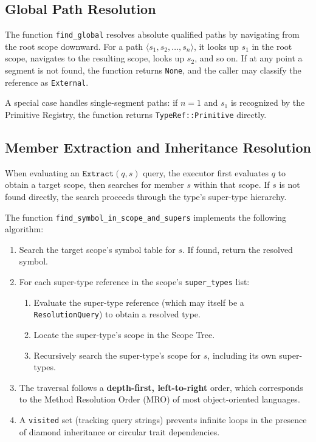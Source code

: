\subsection{Global Path Resolution}

The function \texttt{find\_global} resolves absolute qualified paths
by navigating from the root scope downward. For a path $\langle s_1,
s_2, \ldots, s_n \rangle$, it looks up $s_1$ in the root scope,
navigates to the resulting scope, looks up $s_2$, and so on. If at
any point a segment is not found, the function returns \texttt{None},
and the caller may classify the reference as \texttt{External}.

A special case handles single-segment paths: if $n = 1$ and $s_1$ is
recognized by the Primitive Registry, the function returns
\texttt{TypeRef::Primitive} directly.

\subsection{Member Extraction and Inheritance Resolution}
\label{sec:inheritance_resolution}

When evaluating an $\texttt{Extract}(q, s)$ query, the executor first
evaluates $q$ to obtain a target scope, then searches for member $s$
within that scope. If $s$ is not found directly, the search proceeds
through the type's super-type hierarchy.

The function \texttt{find\_symbol\_in\_scope\_and\_supers} implements
the following algorithm:

\begin{enumerate}
  \item Search the target scope's symbol table for $s$. If found,
    return the resolved symbol.
  \item For each super-type reference in the scope's \texttt{super\_types} list:
    \begin{enumerate}
      \item Evaluate the super-type reference (which may itself be a
        \texttt{ResolutionQuery}) to obtain a resolved type.
      \item Locate the super-type's scope in the Scope Tree.
      \item Recursively search the super-type's scope for $s$,
        including its own super-types.
    \end{enumerate}
  \item The traversal follows a \textbf{depth-first, left-to-right}
    order, which corresponds to the Method Resolution Order (MRO) of
    most object-oriented languages.
  \item A \texttt{visited} set (tracking query strings) prevents
    infinite loops in the presence of diamond inheritance or circular
    trait dependencies.
\end{enumerate}

